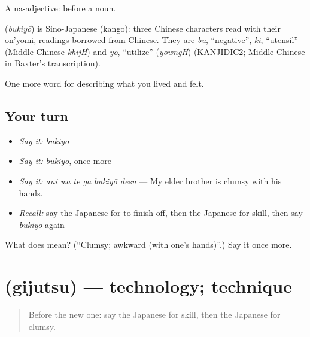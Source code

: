 A na-adjective:  before a noun.

\begin{cousinweb}
\textbf{} (\emph{bukiyō}) is Sino-Japanese (kango): three Chinese characters read with their on'yomi, readings borrowed from Chinese. They are \emph{bu}, \textquotedblleft{}negative\textquotedblright{}, \emph{ki}, \textquotedblleft{}utensil\textquotedblright{} (Middle Chinese \emph{khijH}) and \emph{yō}, \textquotedblleft{}utilize\textquotedblright{} (\emph{yowngH}) (KANJIDIC2; Middle Chinese in Baxter's transcription).
\end{cousinweb}

\begin{grammarlens}[title={What you've built}]
One more word for describing what you lived and felt.
\end{grammarlens}

\subsection*{Your turn}
\begin{itemize}
\raggedright
  \item \emph{Say it:} \emph{bukiyō}
  \item \emph{Say it:} \emph{bukiyō}, once more
  \item \emph{Say it:} \emph{ani wa te ga bukiyō desu} — My elder brother is clumsy with his hands.
  \item \emph{Recall:} say the Japanese for to finish off, then the Japanese for skill, then say \emph{bukiyō} again
\end{itemize}

\begin{tcolorbox}[breakable,colback=teal!4,colframe=teal!35!black,title={Before you move on}]
What does  mean? (\textquotedblleft{}Clumsy; awkward (with one's hands)\textquotedblright{}.) Say it once more.
\end{tcolorbox}
\section[\texorpdfstring{\ja{ぎじゅつ} (gijutsu)}{ぎじゅつ (gijutsu)}]{ (gijutsu) — technology; technique}

\label{lesson:JA-C481-gijutsu}



\begin{quote}
Before the new one: say the Japanese for skill, then the Japanese for clumsy.
\end{quote}

